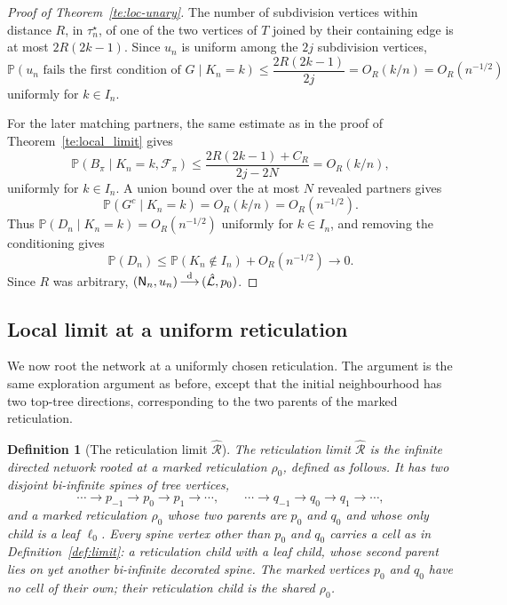 \documentclass[english,11pt]{smfart}
\newcommand{\Prb}[1]{\mathbb{P}\left(#1\right)}
\newcommand{\convdis}{\,{\buildrel \mathrm{d} \over \longrightarrow}\,}
\newcommand{\cL}{\mathcal{L}}
\newcommand{\cR}{\mathcal{R}}
\newcommand{\mN}{\mathsf{N}}
\newtheorem{definition}[theorem]{Definition}
\numberwithin{equation}{section}
\begin{document}
\begin{proof}[Proof of Theorem~\ref{te:loc-unary}]
\smallskip
The number of subdivision vertices within distance \(R\), in \(\tau_n^{\star}\), of
one of the two vertices of \(T\) joined by their containing edge is at most
\(2R(2k-1)\). Since \(u_n\) is uniform among the \(2j\) subdivision vertices,
\[
  \Prb{u_n\text{ fails the first condition of }G\mid K_n=k}
  \le
  \frac{2R(2k-1)}{2j}
  =
  O_R(k/n)
  =
  O_R(n^{-1/2})
\]
uniformly for \(k\in I_n\).

\smallskip
For the later matching partners, the same estimate as in the proof of
Theorem~\ref{te:local_limit} gives
\[
  \Prb{B_\pi\mid K_n=k,\mathcal F_\pi}
  \le
  \frac{2R(2k-1)+C_R}{2j-2N}
  =
  O_R(k/n),
\]
uniformly for \(k\in I_n\). A union bound over the at most \(N\) revealed
partners gives
\[
  \Prb{G^c\mid K_n=k}=O_R(k/n)=O_R(n^{-1/2}).
\]
Thus \(\Prb{D_n\mid K_n=k}=O_R(n^{-1/2})\) uniformly for \(k\in I_n\), and
removing the conditioning gives
\[
  \Prb{D_n}\le \Prb{K_n\notin I_n}+O_R(n^{-1/2})\to0.
\]
Since \(R\) was arbitrary, \((\mN_n,u_n)\convdis(\hat{\cL},p_0)\).
\end{proof}

\subsection{Local limit at a uniform reticulation}
\label{ssec:ret}

We now root the network at a uniformly chosen reticulation. The argument is the
same exploration argument as before, except that the initial neighbourhood has
two top-tree directions, corresponding to the two parents of the marked
reticulation.

\begin{definition}[The reticulation limit $\hat{\cR}$]\label{def:Rhat}
The \emph{reticulation limit} $\hat{\cR}$ is the infinite directed network
rooted at a marked reticulation $\rho_0$, defined as follows. It has two
disjoint bi-infinite spines of tree vertices,
\[
  \cdots\to p_{-1}\to p_0\to p_1\to\cdots,
  \qquad
  \cdots\to q_{-1}\to q_0\to q_1\to\cdots,
\]
and a marked reticulation $\rho_0$ whose two parents are $p_0$ and $q_0$
and whose only child is a leaf $\ell_0$. Every spine vertex other than
$p_0$ and $q_0$ carries a cell as in Definition~\ref{def:limit}: a
reticulation child with a leaf child, whose second parent lies on yet
another bi-infinite decorated spine. The marked vertices $p_0$ and $q_0$
have no cell of their own; their reticulation child is the shared
$\rho_0$.
\end{definition}
\end{document}
